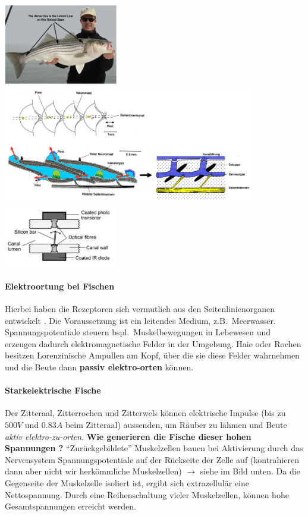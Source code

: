 \begin{center}
    \includegraphics[width=5cm]{lec8/figures/fisch.png}
    \hfill
    \includegraphics[width=11cm]{lec8/figures/seitenliniensystem.png}
    \\
    \includegraphics[width=5cm]{lec8/figures/mechanirezeptor.png}
\end{center}

\paragraph{Elektroortung bei Fischen} Hierbei haben die Rezeptoren sich vermutlich aus den Seitenlinienorganen entwickelt \dangersign. Die Voraussetzung ist ein leitendes Medium, z.B.\ Meerwasser. Spannungspotentiale steuern bspl.\ Muskelbewegungen in Lebewesen und erzeugen dadurch elektromagnetische Felder in der Umgebung. Haie oder Rochen besitzen Lorenzinische Ampullen am Kopf, über die sie diese Felder wahrnehmen und die Beute dann \textbf{passiv elektro-orten} können.

\paragraph{Starkelektrische Fische} Der Zitteraal, Zitterrochen und Zitterwels können elektrische Impulse (bis zu $500V$ und $0.83A$ beim Zitteraal) aussenden, um Räuber zu lähmen und Beute \textit{aktiv elektro-zu-orten}. \textbf{Wie generieren die Fische dieser hohen Spannungen \dangersign?} ``Zurückgebildete'' Muskelzellen bauen bei Aktivierung durch das Nervensystem Spannungspotentiale auf der Rückseite der Zelle auf (kontrahieren dann aber nicht wir herkömmliche Muskelzellen) $\rightarrow$ siehe im Bild unten. Da die Gegenseite der Muskelzelle isoliert ist, ergibt sich extrazellulär eine Nettospannung. Durch eine Reihenschaltung vieler Muskelzellen, können hohe Gesamtspannungen erreicht werden.


